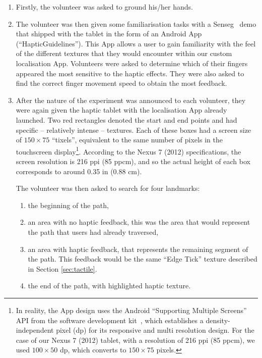 \begin{enumerate}

\item Firstly, the volunteer was asked to ground his/her hands. 

\item The volunteer was then given some familiarisation tasks with a Senseg\texttrademark~ demo that shipped with the tablet in the form of an Android App (``HapticGuidelines''). This App allows a user to gain familiarity with the feel of the different textures that they would encounter within our custom localisation App. Volunteers were asked to determine which of their fingers appeared the most sensitive to the haptic effects.  They were also asked to find the correct finger movement speed to obtain the most feedback. 

\item After the nature of the experiment was announced to each volunteer, they were again given the haptic tablet with the localisation App already launched. Two red rectangles denoted the start and end points and had specific -- relatively intense -- textures. Each of these boxes had a screen size of $150 \times 75$ ``tixels'', equivalent to the same number of pixels in the touchscreen display\footnote{In reality, the App design uses the Android ``Supporting Multiple Screens'' API from the software development kit~\citep{AndroidAPI}, which establishes a density-independent pixel (dp) for its responsive and multi resolution design. For the case of our Nexus 7 (2012) tablet, with a resolution of 216 ppi (85 ppcm), we used $100 \times 50$ dp, which converts to $150 \times 75$ pixels.}. According to the Nexus 7 (2012) specifications, the screen resolution is 216 ppi (85 ppcm), and so the actual height of each box corresponds to around 0.35 in (0.88 cm). 

The volunteer was then asked to search for four landmarks: 

\begin{enumerate}
\item the beginning of the path,
\item an area with no haptic feedback, this was the area that would represent the path that users had already traversed,
\item an area with haptic feedback, that represents the remaining segment of the path. This feedback would be the same ``Edge Tick'' texture described in Section \ref{sec:tactile}.
\item the end of the path, with highlighted haptic texture.
\end{enumerate}


\end{enumerate}
